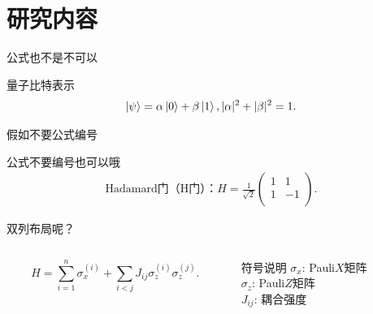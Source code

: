\documentclass{beamer}
\begin{document}
\section{研究内容}

\begin{frame}{公式也不是不可以}
    \begin{exampleblock}{量子比特表示}
        \begin{equation}
            \ket{\psi}=\alpha\ket{0}+\beta\ket{1}, |\alpha|^2+|\beta|^2=1.
        \end{equation}
    \end{exampleblock}
\end{frame}

\begin{frame}{假如不要公式编号}
    \begin{exampleblock}{公式不要编号也可以哦~}
        \begin{equation*}
            \begin{aligned}
                \text{Hadamard门（H门）：​}H=\frac{1}{\sqrt{2}}\left(\begin{array}{cc}
                    1 & 1 \\
                    1 & -1 \\
                \end{array}\right).
            \end{aligned}
        \end{equation*}
    \end{exampleblock}
\end{frame}

\begin{frame}{双列布局呢？}
    \begin{columns}
        \begin{column}{0.7\textwidth}
            \begin{equation}
                H = \sum_{i=1}^n \sigma_x^{(i)} + \sum_{i<j} J_{ij} \sigma_z^{(i)} \sigma_z^{(j)}.
            \end{equation}
        \end{column}
        \begin{column}{0.3\textwidth}
            \begin{block}{符号说明}
                $\sigma_x$: Pauli$X$矩阵 \\
                $\sigma_z$: Pauli$Z$矩阵 \\
                $J_{ij}$: 耦合强度
            \end{block}
        \end{column}
    \end{columns}
\end{frame}
\end{document}
